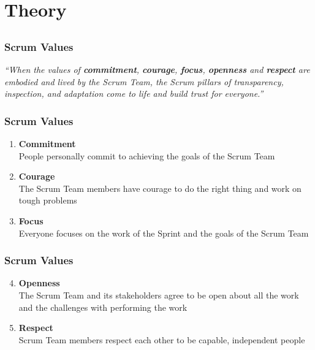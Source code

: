 \section{Theory}
\subsection{}

\begin{frame}
    \frametitle{Scrum Values}
    \noindent
    \textit{``When the values of \textbf{commitment}, \textbf{courage}, \textbf{focus}, \textbf{openness} and \textbf{respect} are embodied and lived by the Scrum Team, the Scrum pillars of transparency, inspection, and adaptation come to life and build trust for everyone.''}
\end{frame}

\begin{frame}
    \frametitle{Scrum Values}
    \begin{enumerate}
        \setlength\itemsep{0.7em}
        \item<1-> \textbf{Commitment}\\
        People personally commit to achieving the goals of the Scrum Team
        \item<2-> \textbf{Courage}\\
        The Scrum Team members have courage to do the right thing and work on tough problems
        \item<3-> \textbf{Focus}\\
        Everyone focuses on the work of the Sprint and the goals of the Scrum Team
    \end{enumerate}
\end{frame}

\begin{frame}
    \frametitle{Scrum Values}
    \begin{enumerate}
        \setcounter{enumi}{3}
        \setlength\itemsep{0.7em}
        \item<1-> \textbf{Openness}\\
        The Scrum Team and its stakeholders agree to be open about all the work and the challenges with performing the work
        \item<2-> \textbf{Respect}\\
        Scrum Team members respect each other to be capable, independent people
    \end{enumerate}
\end{frame}